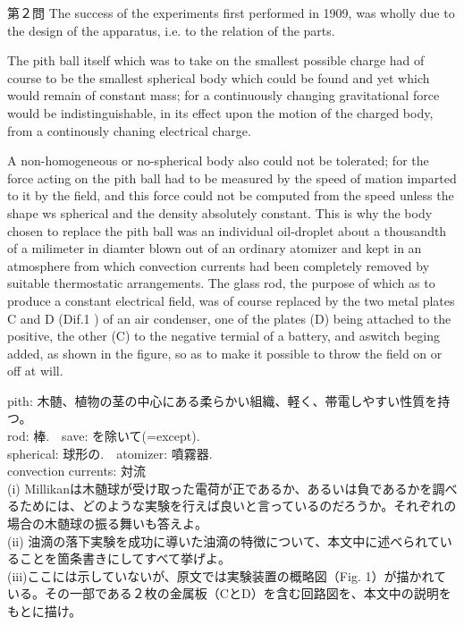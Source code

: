 \documentclass[fleqn]{jbook}
\begin{document}
\begin{question}{第２問}{}
\qquad The success of the experiments first performed in 1909, was wholly due to the design of the apparatus, i.e. to the relation of the parts.

\qquad The pith ball itself which was to take on the smallest possible charge had of course to be the smallest spherical body which could be found and yet which would remain of constant mass; for a continuously changing gravitational force would be indistinguishable, in its effect upon the motion of the charged body, from a continously chaning electrical charge.

\qquad A non-homogeneous or no-spherical body also could not be tolerated; for the force acting on the pith ball had to be measured by the speed of mation imparted to it by the field, and this force could not be computed from the speed unless the shape ws spherical and the density absolutely constant. This is why the body chosen to replace the pith ball was an individual oil-droplet about a thousandth of a milimeter in diamter blown out of an ordinary atomizer and kept in an atmosphere from which convection currents had been completely removed by suitable thermostatic arrangements. The glass rod, the purpose of which as to produce a constant electrical field, was of course replaced by the two metal plates C and D (Dif.1 ) of an air condenser, one of the plates (D) being attached to the positive, the other (C) to the negative termial of a battery, and aswitch beging added, as shown in the figure, so as to make it possible to throw the field on or off at will.

\hspace{1cm} pith: 木髄、植物の茎の中心にある柔らかい組織、軽く、帯電しやすい性質を持つ。\\
\hspace{1cm} rod: 棒.~~save: を除いて(=except).\\
\hspace{1cm} spherical: 球形の.~~atomizer: 噴霧器.\\
\hspace{1cm} convection currents: 対流\\

(i)
Millikanは木髄球が受け取った電荷が正であるか、あるいは負であるかを調べるためには、どのような実験を行えば良いと言っているのだろうか。それぞれの場合の木髄球の振る舞いも答えよ。\\

(ii)
油滴の落下実験を成功に導いた油滴の特徴について、本文中に述べられていることを箇条書きにしてすべて挙げよ。\\

(iii)ここには示していないが、原文では実験装置の概略図（Fig. 1）が描かれている。その一部である２枚の金属板（CとD）を含む回路図を、本文中の説明をもとに描け。\\
\end{question}
\end{document}
